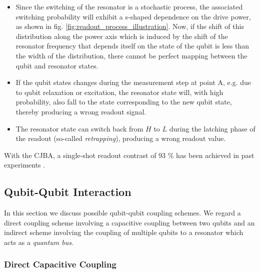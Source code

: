 \begin{itemize}
\item Since the switching of the resonator is a stochastic process, the associated switching probability will exhibit a s-shaped dependence on the drive power, as shown in fig. \ref{fig:readout_process_illustration}. Now, if the shift of this distribution along the power axis which is induced by the shift of the resonator frequency that depends itself on the state of the qubit is less than the width of the distribution, there cannot be perfect mapping between the qubit and resonator states.
\item If the qubit states changes during the measurement step at point A, e.g. due to qubit relaxation or excitation, the resonator state will, with high probability, also fall to the state corresponding to the new qubit state, thereby producing a wrong readout signal.
\item The resonator state can switch back from $H$ to $L$ during the latching phase of the readout (so-called {\it retrapping}), producing a wrong readout value.
\end{itemize}

With the CJBA, a single-shot readout contrast of 93 \% has been achieved in past experiments \citep{mallet_single-shot_2009}.

\subsection{Qubit-Qubit Interaction}

In this section we discuss possible qubit-qubit coupling schemes. We regard a direct coupling scheme involving a capacitive coupling between two qubits and an indirect scheme involving the coupling of multiple qubits to a resonator which acts as a {\it quantum bus}.

\subsubsection{Direct Capacitive Coupling}

